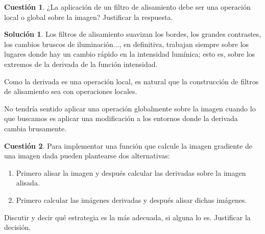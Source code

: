 \documentclass[a4paper, 11pt]{article}
\theoremstyle{definition}
\newtheorem*{solucion}{Solución}
\theoremstyle{theorem}
\newtheorem{cuestion}{Cuestión}
\begin{document}
  \begin{cuestion}
      ¿La aplicación de un filtro de alisamiento debe ser una operación local o global sobre la imagen? Justificar la respuesta.
  \end{cuestion}

  \begin{solucion}
      Los filtros de alisamiento suavizan los bordes, los grandes contrastes, los cambios bruscos de iluminación..., en definitiva, trabajan siempre sobre los lugares donde hay un cambio rápido en la intensidad lumínica; esto es, sobre los extremos de la derivada de la función intensidad.

      Como la derivada es una operación local, es natural que la construcción de filtros de alisamiento sea con operaciones locales.

      No tendría sentido aplicar una operación globalmente sobre la imagen cuando lo que buscamos es aplicar una modificación a los entornos donde la derivada cambia brusamente.
  \end{solucion}

  \begin{cuestion}
      Para implementar una función que calcule la imagen gradiente de una imagen dada pueden plantearse dos alternativas:
      \begin{enumerate}
          \item Primero alisar la imagen y después calcular las derivadas sobre la imagen alisada.
          \item Primero calcular las imágenes derivadas y después alisar dichas imágenes.
      \end{enumerate}

      Discutir y decir qué estrategia es la más adecuada, si alguna lo es. Justificar la decisión.
  \end{cuestion}
\end{document}
